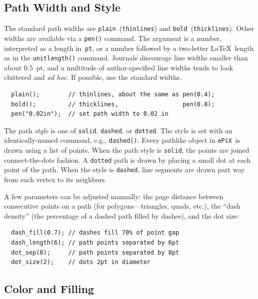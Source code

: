 \documentclass[12pt]{report}
\newcommand{\code}[1]{\texttt{#1}}
\newcommand{\ePiX}{\code{ePiX}}
\begin{document}
\subsection*{Path Width and Style}

The standard path widths are \code{plain}~(\code{thinlines}) and
\code{bold}~(\code{thicklines}). Other widths are available via a
\code{pen()} command. The argument is a number, interpreted as a
length in~\code{pt}, or a number followed by a two-letter \LaTeX\ 
length as in the \code{unitlength()} command.  Journals discourage
line widths smaller than about 0.5~pt, and a multitude of
author-specified line widths tends to look cluttered and \emph{ad
  hoc}. If possible, use the standard widths.
\begin{verbatim}
  plain();        // thinlines, about the same as pen(0.4);
  bold();         // thicklines,                  pen(0.8);
  pen("0.02in");  // set path width to 0.02 in
\end{verbatim}

The path \emph{style} is one of \code{solid}, \code{dashed}, or
\code{dotted}. The style is set with an identically-named command,
e.g., \code{dashed()}.  Every pathlike object in \ePiX\ is drawn using
a list of points. When the path style is \code{solid}, the points are
joined connect-the-dots fashion. A \code{dotted} path is drawn by
placing a small dot at each point of the path. When the style is
\code{dashed}, line segments are drawn part way from each vertex to its
neighbors.
\begin{center}
  
\end{center}
A few parameters can be adjusted manually: the page distance between
consecutive points on a path (for polygons---triangles, quads, etc.),
the ``dash density'' (the percentage of a dashed path filled by
dashes), and the dot size:
\begin{verbatim}
  dash_fill(0.7); // dashes fill 70% of point gap
  dash_length(6); // path points separated by 6pt
  dot_sep(8);     // path points separated by 8pt
  dot_size(2);    // dots 2pt in diameter
\end{verbatim}


\subsection*{Color and Filling}
\end{document}
